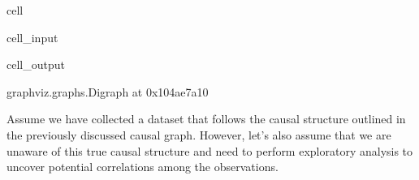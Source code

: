 \documentclass[letterpaper,10pt,english]{jupyterBook}
\begin{document}
\begin{sphinxuseclass}{cell}\begin{sphinxVerbatimInput}

\begin{sphinxuseclass}{cell_input}
\begin{sphinxVerbatim}[commandchars=\\\{\}]
 
   

  

 
 
 

 
 

\end{sphinxVerbatim}

\end{sphinxuseclass}\end{sphinxVerbatimInput}
\begin{sphinxVerbatimOutput}

\begin{sphinxuseclass}{cell_output}
\begin{sphinxVerbatim}[commandchars=\\\{\}]
\PYGZlt{}graphviz.graphs.Digraph at 0x104ae7a10\PYGZgt{}
\end{sphinxVerbatim}

\end{sphinxuseclass}\end{sphinxVerbatimOutput}

\end{sphinxuseclass}
\sphinxAtStartPar
Assume we have collected a dataset that follows the causal structure outlined in the previously discussed causal graph. However, let’s also assume that we are unaware of this true causal structure and need to perform exploratory analysis to uncover potential correlations among the observations.
\end{document}

